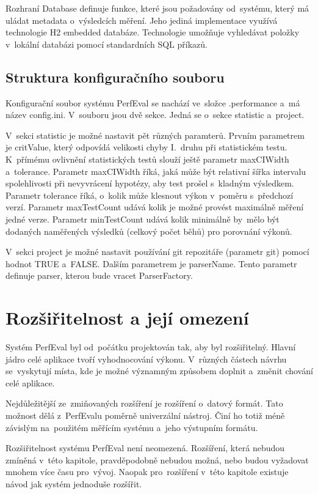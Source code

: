 Rozhraní Database definuje funkce, které jsou požadovány od~systému, který má uládat
metadata o~výsledcích měření. Jeho jediná implementace využívá technologie H2 embedded databáze.
Technologie umožňuje vyhledávat položky v~lokální databázi pomocí standardních SQL příkazů.

\subsection{Struktura konfiguračního souboru}

Konfigurační soubor systému PerfEval se nachází ve~složce .performance a~má název config.ini.
V~souboru jsou dvě sekce. Jedná se o~sekce statistic a~project.

V~sekci statistic je možné nastavit
pět různých paramterů. Prvním parametrem je critValue, který odpovídá velikosti chyby I.~druhu při
statistickém testu. K~přímému ovlivnění statistických testů slouží ještě parametr maxCIWidth a~tolerance.
Parametr maxCIWidth říká, jaká může být relativní šířka intervalu spolehlivosti při nevyvrácení hypotézy, aby test prošel
s~kladným výsledkem. Parametr tolerance říká, o~kolik může klesnout výkon v~poměru s~předchozí verzí.
Parametr maxTestCount udává kolik je možné provést maximálně měření jedné verze. Parametr minTestCount
udává kolik minimálně by~mělo být dodaných naměřených výsledků (celkový počet běhů)
pro porovnání výkonů.

V~sekci project je možné nastavit používání git repozitáře (parametr git) pomocí hodnot TRUE a~FALSE.
Dalším parametrem je parserName. Tento parametr definuje parser, kterou bude vracet ParserFactory.

\section{Rozšiřitelnost a její omezení}

Systém PerfEval byl od~počátku projektován tak, aby byl rozšiřitelný. Hlavní jádro
celé aplikace tvoří vyhodnocování výkonu. V~různých částech návrhu se~vyskytují místa,
kde je možné významným způsobem doplnit a~změnit chování celé aplikace.

Nejdůležitější ze~zmiňovaných rozšíření je rozšíření o~datový formát. Tato možnost dělá z~PerfEvalu
poměrně univerzální nástroj. Činí ho totiž méně závislým na~použitém měřícím systému a~jeho výstupním formátu.

Rozšiřitelnost systému PerfEval není neomezená. Rozšíření, která nebudou zmíněná v~této kapitole,
pravděpodobně nebudou možná, nebo budou vyžadovat mnohem více času pro~vývoj. Naopak pro~rozšíření
v~této kapitole existuje návod jak systém jednoduše rozšířit.

